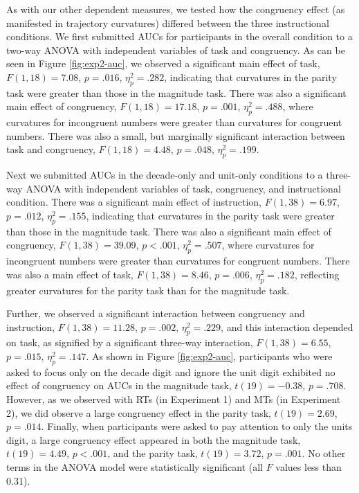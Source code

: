 \documentclass[english,man]{apa6}
\theoremstyle{definition}
\theoremstyle{definition}
\theoremstyle{definition}
\theoremstyle{remark}
\begin{document}
As with our other dependent measures, we tested how the congruency
effect (as manifested in trajectory curvatures) differed between the
three instructional conditions. We first submitted AUCs for participants
in the overall condition to a two-way ANOVA with independent variables
of task and congruency. As can be seen in Figure \ref{fig:exp2-auc}, we
observed a significant main effect of task, \(F(1, 18) = 7.08\),
\(p = .016\), \(\eta^2_p = .282\), indicating that curvatures in the
parity task were greater than those in the magnitude task. There was
also a significant main effect of congruency, \(F(1, 18) = 17.18\),
\(p = .001\), \(\eta^2_p = .488\), where curvatures for incongruent
numbers were greater than curvatures for congruent numbers. There was
also a small, but marginally significant interaction between task and
congruency, \(F(1, 18) = 4.48\), \(p = .048\), \(\eta^2_p = .199\).

Next we submitted AUCs in the decade-only and unit-only conditions to a
three-way ANOVA with independent variables of task, congruency, and
instructional condition. There was a significant main effect of
instruction, \(F(1, 38) = 6.97\), \(p = .012\), \(\eta^2_p = .155\),
indicating that curvatures in the parity task were greater than those in
the magnitude task. There was also a significant main effect of
congruency, \(F(1, 38) = 39.09\), \(p < .001\), \(\eta^2_p = .507\),
where curvatures for incongruent numbers were greater than curvatures
for congruent numbers. There was also a main effect of task,
\(F(1, 38) = 8.46\), \(p = .006\), \(\eta^2_p = .182\), reflecting
greater curvatures for the parity task than for the magnitude task.

Further, we observed a significant interaction between congruency and
instruction, \(F(1, 38) = 11.28\), \(p = .002\), \(\eta^2_p = .229\),
and this interaction depended on task, as signified by a significant
three-way interaction, \(F(1, 38) = 6.55\), \(p = .015\),
\(\eta^2_p = .147\). As shown in Figure \ref{fig:exp2-auc}, participants
who were asked to focus only on the decade digit and ignore the unit
digit exhibited no effect of congruency on AUCs in the magnitude task,
\(t(19) = -0.38\), \(p = .708\). However, as we observed with RTs (in
Experiment 1) and MTs (in Experiment 2), we did observe a large
congruency effect in the parity task, \(t(19) = 2.69\), \(p = .014\).
Finally, when participants were asked to pay attention to only the units
digit, a large congruency effect appeared in both the magnitude task,
\(t(19) = 4.49\), \(p < .001\), and the parity task, \(t(19) = 3.72\),
\(p = .001\). No other terms in the ANOVA model were statistically
significant (all \(F\) values less than 0.31).
\end{document}
